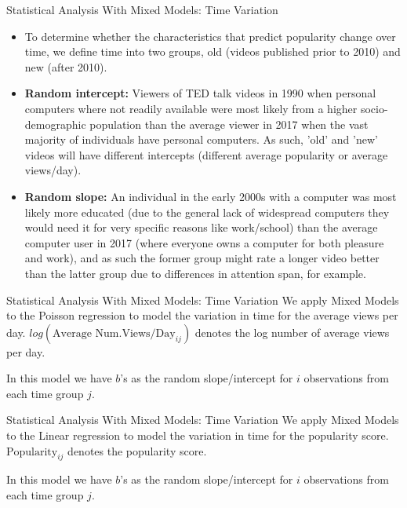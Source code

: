 \begin{frame}{Statistical Analysis With Mixed Models: Time Variation}
	\begin{itemize}
		\item To determine whether the characteristics that predict popularity change over time, we define time into two groups, old (videos published prior to 2010) and new (after 2010). 
		\item \textbf{Random intercept: } Viewers of TED talk videos in 1990 when personal computers where not readily available were most likely from a higher socio-demographic population than the average viewer in 2017 when the vast majority of individuals have personal computers. As such, 'old' and 'new' videos will have different intercepts (different average popularity or average views/day).
		\item \textbf{Random slope: }An individual in the early 2000s with a computer was most likely more educated (due to the general lack of widespread computers they would need it for very specific reasons like work/school) than the average computer user in 2017 (where everyone owns a computer for both pleasure and work), and as such the former group might rate a longer video better than the latter group due to differences in attention span, for example. 
	\end{itemize}
\end{frame}

\begin{frame}{Statistical Analysis With Mixed Models: Time Variation}
We apply Mixed Models to the Poisson regression to model the variation in time for the average views per day. $log(\text{Average Num.Views/Day}_{ij})$ denotes the log number of average views per day.

In this model we have $b$'s as the random slope/intercept for $i$ observations from each time group $j$.
\end{frame}

\begin{frame}{Statistical Analysis With Mixed Models: Time Variation}
We apply Mixed Models to the Linear regression to model the variation in time for the popularity score. $\text{Popularity}_{ij}$ denotes the popularity score.

In this model we have $b$'s as the random slope/intercept for $i$ observations from each time group $j$.
\end{frame}


